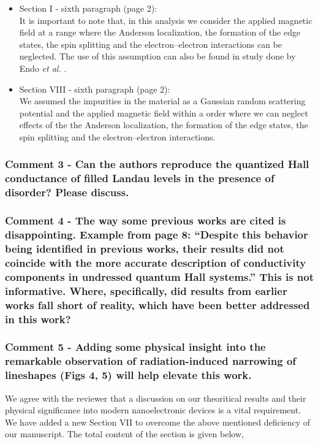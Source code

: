 \documentclass{article}
\begin{document}
\begin{itemize}
  \item Section I - sixth paragraph (page 2):\\
  {\color{Maroon}
  It is important to note that, in this analysis we consider the applied magnetic field at a range where the Anderson localization, the formation of the edge states, the spin splitting and the electron–electron interactions can be neglected. The use of this assumption can also be found in study done by  Endo \textit{et al.} \cite{endo09}.
  }
  \item Section VIII - sixth paragraph (page 2):\\
  {\color{Maroon}
  We assumed the impurities in the material as a Gaussian random scattering potential and the applied magnetic field within a order where we can neglect effects of the the Anderson localization, the formation of the edge states, the spin splitting and the electron–electron interactions.
  }
\end{itemize}


\subsubsection*{Comment 3 -
\color{RoyalBlue} Can the authors reproduce the quantized Hall conductance of filled Landau levels in the presence of disorder? Please discuss.
}



\subsubsection*{Comment 4 -
\color{RoyalBlue} The way some previous works are cited is disappointing. Example from page 8: “Despite this behavior being identified in previous works, their results did not coincide with the more accurate description of conductivity components in undressed quantum Hall systems.” This is not informative. Where, specifically, did results from earlier works fall short of reality, which have been better addressed in this work?
}

\subsubsection*{Comment 5 -
\color{RoyalBlue} Adding some physical insight into the remarkable observation of radiation-induced narrowing of lineshapes (Figs 4, 5) will help elevate
this work.
}

We agree with the reviewer that a discussion on our theoritical results and their physical significance into modern nanoelectronic devices is a vital requirement. We have added a new Section VII to overcome the above mentioned deficiency of our manuscript. The total content of the section is given below,
\end{document}
